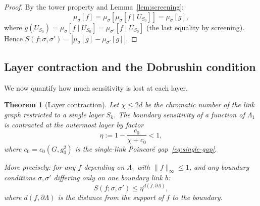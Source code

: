 \documentclass[11pt,a4paper]{article}
\theoremstyle{plain}
\newtheorem{theorem}{Theorem}[section]
\theoremstyle{definition}
\theoremstyle{remark}
\begin{document}
\begin{proof}
By the tower property and Lemma~\ref{lem:screening}:
\[
  \mu_\sigma[f] = \mu_\sigma[\mu_\sigma[f \mid U_{S_0}]]
  = \mu_\sigma[g],
\]
where $g(U_{S_0}) = \mu_\sigma[f \mid U_{S_0}]
= \mu_{\sigma'}[f \mid U_{S_0}]$ (the last equality by screening).
Hence $S(f;\sigma,\sigma') = |\mu_\sigma[g] - \mu_{\sigma'}[g]|$.
\end{proof}

\subsection{Layer contraction and the Dobrushin condition}

We now quantify how much sensitivity is lost at each layer.

\begin{theorem}[Layer contraction]\label{thm:layer_contract}
Let $\chi \le 2d$ be the chromatic number of the link graph
restricted to a single layer $S_k$.  The boundary sensitivity
of a function of $\Lambda_1$ is contracted at the outermost
layer by factor
\begin{equation}\label{eq:contraction}
  \eta := 1 - \frac{c_0}{\chi + c_0} < 1,
\end{equation}
where $c_0 = c_0(G, g_0^2)$ is the single-link Poincar\'e
gap~\eqref{eq:single-gap}.

More precisely: for any $f$ depending on $\Lambda_1$ with
$\|f\|_\infty \le 1$, and any boundary conditions
$\sigma, \sigma'$ differing only on one boundary link $b$:
\begin{equation}\label{eq:single-link-contract}
  S(f;\sigma,\sigma') \le \eta^{d(f, \partial\Lambda)},
\end{equation}
where $d(f, \partial\Lambda)$ is the distance from the
support of $f$ to the boundary.
\end{theorem}
\end{document}
